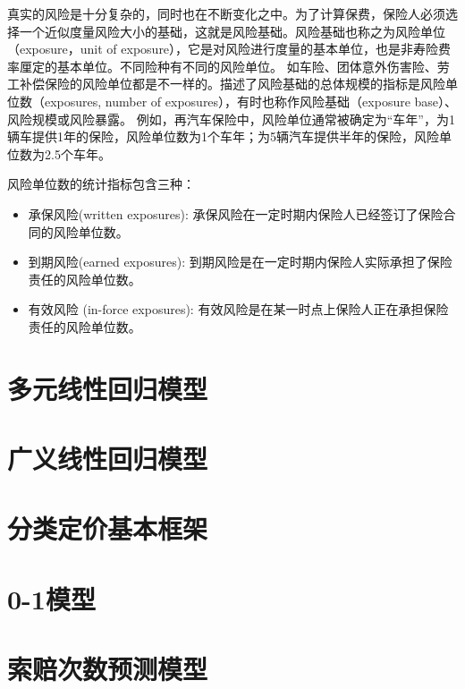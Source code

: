 \documentclass[
]{book}
\begin{document}
真实的风险是十分复杂的，同时也在不断变化之中。为了计算保费，保险人必须选择一个近似度量风险大小的基础，这就是风险基础。风险基础也称之为风险单位（exposure，unit of exposure），它是对风险进行度量的基本单位，也是非寿险费率厘定的基本单位。不同险种有不同的风险单位。 如车险、团体意外伤害险、劳工补偿保险的风险单位都是不一样的。描述了风险基础的总体规模的指标是风险单位数（exposures, number of exposures），有时也称作风险基础（exposure base）、风险规模或风险暴露。
例如，再汽车保险中，风险单位通常被确定为``车年''，为1辆车提供1年的保险，风险单位数为1个车年；为5辆汽车提供半年的保险，风险单位数为2.5个车年。

风险单位数的统计指标包含三种：

\begin{itemize}
\item
  承保风险(written exposures): 承保风险在一定时期内保险人已经签订了保险合同的风险单位数。
\item
  到期风险(earned exposures): 到期风险是在一定时期内保险人实际承担了保险责任的风险单位数。
\item
  有效风险 (in-force exposures): 有效风险是在某一时点上保险人正在承担保险责任的风险单位数。
\end{itemize}

\hypertarget{ux591aux5143ux7ebfux6027ux56deux5f52ux6a21ux578b}{%
\section{多元线性回归模型}\label{ux591aux5143ux7ebfux6027ux56deux5f52ux6a21ux578b}}

\hypertarget{ux5e7fux4e49ux7ebfux6027ux56deux5f52ux6a21ux578b}{%
\section{广义线性回归模型}\label{ux5e7fux4e49ux7ebfux6027ux56deux5f52ux6a21ux578b}}

\hypertarget{ux5206ux7c7bux5b9aux4ef7ux57faux672cux6846ux67b6}{%
\section{分类定价基本框架}\label{ux5206ux7c7bux5b9aux4ef7ux57faux672cux6846ux67b6}}

\hypertarget{ux6a21ux578b}{%
\section{0-1模型}\label{ux6a21ux578b}}

\hypertarget{ux7d22ux8d54ux6b21ux6570ux9884ux6d4bux6a21ux578b}{%
\section{索赔次数预测模型}\label{ux7d22ux8d54ux6b21ux6570ux9884ux6d4bux6a21ux578b}}
\end{document}
